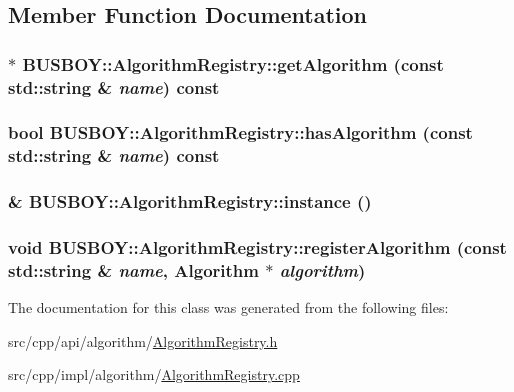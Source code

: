 \subsection{Member Function Documentation}
\hypertarget{classBUSBOY_1_1AlgorithmRegistry_a5bbc93fa93e08cddbc414c31babbf93c}{
\subsubsection[{getAlgorithm}]{ $\ast$ BUSBOY::AlgorithmRegistry::getAlgorithm (const std::string \& {\em name}) const}}
\label{classBUSBOY_1_1AlgorithmRegistry_a5bbc93fa93e08cddbc414c31babbf93c}
\hypertarget{classBUSBOY_1_1AlgorithmRegistry_a6ab4e7174956a41cc49f69ed11cff86b}{
\subsubsection[{hasAlgorithm}]{\setlength{\rightskip}{0pt plus 5cm}bool BUSBOY::AlgorithmRegistry::hasAlgorithm (const std::string \& {\em name}) const}}
\label{classBUSBOY_1_1AlgorithmRegistry_a6ab4e7174956a41cc49f69ed11cff86b}
\hypertarget{classBUSBOY_1_1AlgorithmRegistry_a1e5e862ee4add10f55d0644d17c6e6a1}{
\subsubsection[{instance}]{ \& BUSBOY::AlgorithmRegistry::instance ()}}
\label{classBUSBOY_1_1AlgorithmRegistry_a1e5e862ee4add10f55d0644d17c6e6a1}
\hypertarget{classBUSBOY_1_1AlgorithmRegistry_a5fa9ee449f01c81ed0ca52d288fdf4d8}{
\subsubsection[{registerAlgorithm}]{\setlength{\rightskip}{0pt plus 5cm}void BUSBOY::AlgorithmRegistry::registerAlgorithm (const std::string \& {\em name}, \/  {\bf Algorithm} $\ast$ {\em algorithm})}}
\label{classBUSBOY_1_1AlgorithmRegistry_a5fa9ee449f01c81ed0ca52d288fdf4d8}


The documentation for this class was generated from the following files:\begin{DoxyCompactItemize}
\item 
src/cpp/api/algorithm/\hyperlink{AlgorithmRegistry_8h}{AlgorithmRegistry.h}\item 
src/cpp/impl/algorithm/\hyperlink{AlgorithmRegistry_8cpp}{AlgorithmRegistry.cpp}\end{DoxyCompactItemize}
